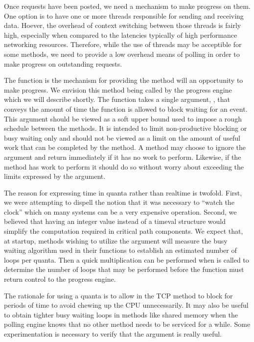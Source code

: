 Once requests have been posted, we need a mechanism to make progress on them.
One option is to have one or more threads responsible for sending and receiving
data.  Hoever, the overhead of context switching between those threads is
fairly high, especially when compared to the latencies typically of high
performance networking resources.  Therefore, while the use of threads may be
acceptible for some methods, we need to provide a low overhead means of polling
in order to make progress on outstanding requests.

The  function is the mechanism for providing the method will
an opportunity to make progress.  We envision this method being called by the
progress engine which we will describe shortly.  The  function takes
a single argument, , that conveys the amount of time the function
is allowed to block waiting for an event.  This argument should be viewed as a
soft upper bound used to impose a rough schedule between the methods.  It is
intended to limit non-productive blocking or busy waiting only and should not
be viewed as a limit on the amount of useful work that can be completed by the
method.  A method may choose to ignore the argument and return immediately if
it has no work to perform.  Likewise, if the method has work to perform it
should do so without worry about exceeding the limits expressed by the
 argument.

The reason for expressing time in quanta rather than realtime is twofold.
First, we were attempting to dispell the notion that it was necessary to
``watch the clock'' which on many systems can be a very expensive operation.
Second, we believed that having an integer value instead of a timeval structure
would simplify the computation required in critical path components.  We expect
that, at startup, methods wishing to utilize the  argument will
measure the busy waiting algorithm used in their  functions to
establish an estimated number of loops per quanta.  Then a quick multiplication
can be performed when  is called to determine the number of loops
that may be performed before the  function must return control to
the progress engine.

\begin{discussion}
  The rationale for using a quanta is to allow  in the TCP
  method to block for periods of time to avoid chewing up the CPU
  unnecessarily.  It may also be useful to obtain tighter busy waiting loops in
  methods like shared memory when the polling engine knows that no other method
  needs to be serviced for a while.  Some experimentation is necessary to
  verify that the  argument is really useful.
\end{discussion}

